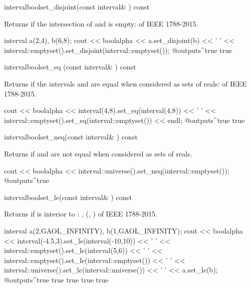 \documentclass[12pt,a4paper,twoside,openright]{book}
\begin{document}
\begin{defmethod}{interval}{bool}{set\_disjoint}{(const interval\& ) const}
  \begin{operation}
  \end{operation}
  Returns  if the intersection of  and  is
  empty:  of IEEE 1788-2015.

\begin{example}
interval a(2,4), b(6,8);
cout << boolalpha << a.set_disjoint(b) << ' '
     << interval::emptyset().set_disjoint(interval::emptyset());
@outputs^true true~
\end{example}
\end{defmethod}

\begin{defmethod}{interval}{bool}{set\_eq }{(const interval\& ) const}
  \begin{operation}
  \end{operation}
  Returns  if the intervals  and  are equal
  when considered as sets of reals:  of IEEE 1788-2015.
\begin{example}
cout << boolalpha << interval(4,8).set_eq(interval(4,8)) << ' '
     << interval::emptyset().set_eq(interval::emptyset()) << endl;
@outputs^true true~
\end{example}
\end{defmethod}

\begin{defmethod}{interval}{bool}{set\_neq}{(const interval\& ) const}
    \begin{operation}
    \end{operation}
    Returns  if  and  are not equal when
    considered as sets of reals.
    \begin{example}
cout << boolalpha << interval::universe().set_neq(interval::emptyset());
@outputs^true~
    \end{example}
\end{defmethod}

\begin{defmethod}{interval}{bool}{set\_le}{(const interval\& ) const}
  \begin{operation}
  \end{operation}
  Returns  if  is interior to :
  , (,
  ) of IEEE 1788-2015.\newinvfive
\begin{example}
interval a(2,GAOL_INFINITY), b(1,GAOL_INFINITY);
cout << boolalpha << interval(-4.5,3).set_le(interval(-10,10)) << ' '
     << interval::emptyset().set_le(interval(5,6)) << ' '
     << interval::emptyset().set_le(interval::emptyset()) << ' '
     << interval::universe().set_le(interval::universe()) << ' '
     << a.set_le(b);
@outputs^true true true true true~
\end{example}
\end{defmethod}
\end{document}
